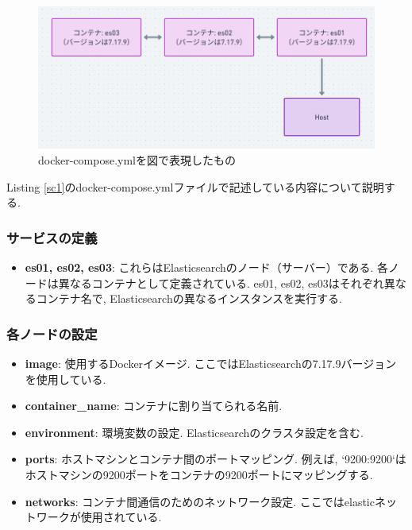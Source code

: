 \begin{figure}[h]
  \begin{center}
    \includegraphics[width=160mm]{sotu/figure/all-7.19.9.png}
    \caption{docker-compose.ymlを図で表現したもの}
    \label{d1}
  \end{center}
\end{figure}

Listing \ref{sc1}のdocker-compose.ymlファイルで記述している内容について説明する.

\subsubsection*{サービスの定義}
\begin{itemize}
  \item \textbf{es01, es02, es03}: これらはElasticsearchのノード（サーバー）である. 各ノードは異なるコンテナとして定義されている. es01, es02, es03はそれぞれ異なるコンテナ名で, Elasticsearchの異なるインスタンスを実行する.
\end{itemize}

\subsubsection*{各ノードの設定}
\begin{itemize}
  \item \textbf{image}: 使用するDockerイメージ. ここではElasticsearchの7.17.9バージョンを使用している.
  \item \textbf{container\_name}: コンテナに割り当てられる名前.
  \item \textbf{environment}: 環境変数の設定. Elasticsearchのクラスタ設定を含む.
  \item \textbf{ports}: ホストマシンとコンテナ間のポートマッピング. 例えば, `9200:9200`はホストマシンの9200ポートをコンテナの9200ポートにマッピングする.
  \item \textbf{networks}: コンテナ間通信のためのネットワーク設定. ここではelasticネットワークが使用されている.
\end{itemize}

